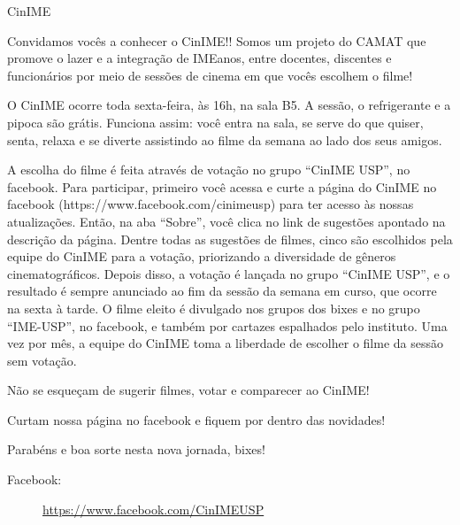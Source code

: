 \begin{subsecao}{CinIME}


Convidamos vocês a conhecer o CinIME!! Somos um projeto do CAMAT que promove o
lazer e a integração de IMEanos, entre docentes, discentes e funcionários por
meio de sessões de cinema em que vocês escolhem o filme!

O CinIME ocorre toda sexta-feira, às 16h, na sala B5. A sessão, o refrigerante
e a pipoca são grátis. Funciona assim: você entra na sala, se serve do que
quiser, senta, relaxa e se diverte assistindo ao filme da semana ao lado dos
seus amigos.

A escolha do filme é feita através de votação no grupo “CinIME USP”, no
facebook. Para participar, primeiro você acessa e curte a página do CinIME no
facebook (https://www.facebook.com/cinimeusp) para ter acesso às nossas
atualizações. Então, na aba “Sobre”, você clica no link de sugestões apontado
na descrição da página. Dentre todas as sugestões de filmes, cinco são
escolhidos pela equipe do CinIME para a votação, priorizando a diversidade de
gêneros cinematográficos. Depois disso, a votação é lançada no grupo “CinIME
USP”, e o resultado é sempre anunciado ao fim da sessão da semana em curso, que ocorre
na sexta à tarde. O filme eleito é divulgado nos grupos
dos bixes e no grupo “IME-USP”, no facebook, e também por cartazes espalhados
pelo instituto. Uma vez por mês, a equipe do CinIME toma a liberdade de
escolher o filme da sessão sem votação.

Não se esqueçam de sugerir filmes, votar e comparecer ao CinIME!

Curtam nossa página no facebook e fiquem por dentro das novidades!

Parabéns e boa sorte nesta nova jornada, bixes!

\begin{description}
  \item[Facebook:] \url{https://www.facebook.com/CinIMEUSP}
\end{description}

\end{subsecao}
